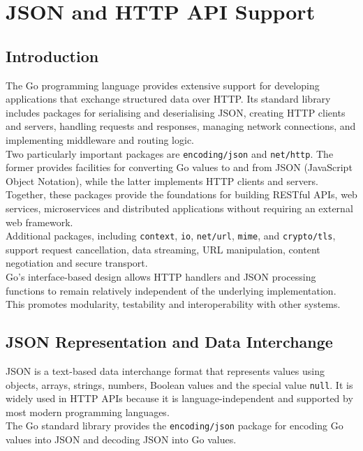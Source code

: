 \section{JSON and HTTP API Support}

\subsection{Introduction}

The Go programming language provides extensive support for developing applications that exchange structured data over HTTP. Its standard library includes packages for serialising and deserialising JSON, creating HTTP clients and servers, handling requests and responses, managing network connections, and implementing middleware and routing logic.\\

Two particularly important packages are \texttt{encoding/json} and \texttt{net/http}. The former provides facilities for converting Go values to and from JSON (JavaScript Object Notation), while the latter implements HTTP clients and servers. Together, these packages provide the foundations for building RESTful APIs, web services, microservices and distributed applications without requiring an external web framework.\\

Additional packages, including \texttt{context}, \texttt{io}, \texttt{net/url}, \texttt{mime}, and \texttt{crypto/tls}, support request cancellation, data streaming, URL manipulation, content negotiation and secure transport.\\

Go's interface-based design allows HTTP handlers and JSON processing functions to remain relatively independent of the underlying implementation. This promotes modularity, testability and interoperability with other systems.

\subsection{JSON Representation and Data Interchange}

JSON is a text-based data interchange format that represents values using objects, arrays, strings, numbers, Boolean values and the special value \texttt{null}. It is widely used in HTTP APIs because it is language-independent and supported by most modern programming languages.\\

The Go standard library provides the \texttt{encoding/json} package for encoding Go values into JSON and decoding JSON into Go values.\\

